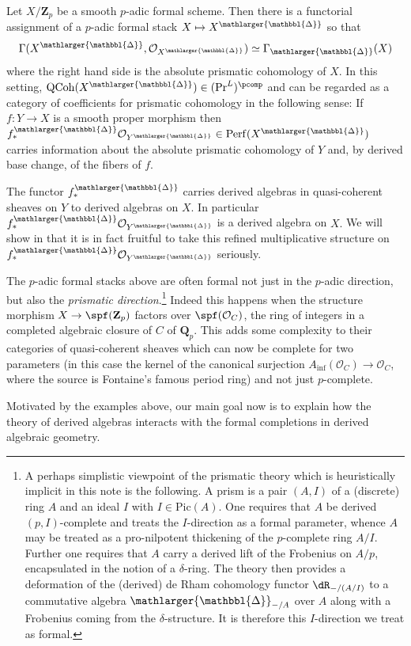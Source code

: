 \documentclass[10pt,reqno]{amsart}
\numberwithin{equation}{section}
\newcommand{\cO}{{\mathcal{O}}}
\newcommand{\ZZ}{\mathbf{Z}}
\newcommand{\QQ}{\mathbf{Q}}
\newcommand{\Qcoh}{\mathrm{QCoh}}
\newcommand{\Pic}{\mathrm{Pic}}
\newcommand{\Perf}{\mathrm{Perf}}
\renewcommand{\inf}{\mathrm{inf}}
\newcommand{\Prism}{{\mathlarger{\mathbbl{\Delta}}}}
\begin{document}
\begin{example}
    Let $X/\ZZ_p$ be a smooth $p$-adic formal scheme. Then there is a functorial assignment of a $p$-adic formal stack $X\mapsto X^\Prism$ so that $$\Gamma(X^\Prism, \cO_{X^\Prism})\simeq \Gamma_{\Prism}(X)$$ where the right hand side is the absolute prismatic cohomology of $X.$  In this setting, $\Qcoh(X^\Prism)\in (\Pr^L)^\pcomp$  and can be regarded as a category of coefficients for prismatic cohomology in the following sense: If $f\colon Y\to X$  is a smooth proper morphism then $f^\Prism_*\cO_{Y^\Prism}\in \Perf(X^\Prism)$ carries information about the absolute prismatic cohomology of $Y$ and, by derived base change, of the fibers of $f$. 
    
    The functor $f^\Prism_*$ carries derived algebras in quasi-coherent sheaves on $Y$ to derived algebras on $X$. In particular $f^\Prism_*\cO_{Y^\Prism}$ is a derived algebra on $X.$ We will show in \cite{Sah25Syn} that it is in fact fruitful to take this refined multiplicative structure on $f^\Prism_*\cO_{Y^\Prism}$ seriously.

    The $p$-adic formal stacks above are often formal not just in the $p$-adic direction, but also the \emph{prismatic direction}.\footnote{A perhaps simplistic viewpoint of the prismatic theory which is heuristically implicit in this note is the following. A prism is a pair $(A,I)$ of a (discrete) ring $A$ and an ideal $I$ with $I\in \Pic(A)$. One requires that $A$ be derived $(p,I)$-complete and treats the $I$-direction as a formal parameter, whence $A$ may be treated as a pro-nilpotent thickening of the $p$-complete ring $A/I$. Further one requires that $A$ carry a derived lift of the Frobenius on $A/p$, encapsulated in the notion of a $\delta$-ring.
The theory then provides a deformation of the (derived) de Rham cohomology functor $\dR_{-/(A/I)}$ to a commutative algebra $\Prism_{-/A}$ over $A$ along with a Frobenius coming from the $\delta$-structure. It is therefore this $I$-direction we treat as formal.} Indeed this happens when the structure morphism $X\to \spf(\ZZ_p)$ factors over $\spf(\cO_C)$, the ring of integers in a completed algebraic closure of $C$ of $\QQ_p$. This adds some complexity to their categories of quasi-coherent sheaves which can now be complete for two parameters (in this case the kernel of the canonical surjection $A_\inf(\cO_C)\to \cO_C$, where the source is Fontaine's famous period ring) and not just $p$-complete.
\end{example}


Motivated by the examples above, our  main goal now is to explain how the theory of derived algebras interacts with the formal completions in derived algebraic geometry. 
\end{document}
